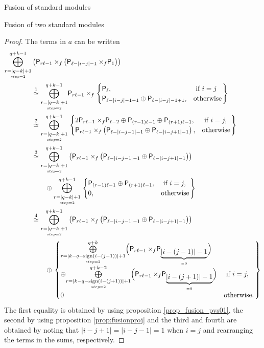 \documentclass[reqno]{amsart}
\newcommand{\dP}[1]{\mathsf P_{#1}}
\newcommand{\xf}{\times\hspace{-0.27em}_f}
\newcommand{\lc}{\ell}
\begin{document}
\begin{section}{Fusion of standard modules}
\begin{subsection}{Fusion of two standard modules}
\begin{proof}
The terms in $a$ can be written
\begin{align}
\overset{q+k-1}{\underset{\underset{step =2}{r = |q-k|+1}}{\bigoplus}}&\left(\dP{r \lc -1} \xf \left(\dP{\lc-|i-j|-1}\xf \dP{1} \right)\right) \notag\\
& \overset{1}{\simeq} \overset{q+k-1}{\underset{\underset{step =2}{r = |q-k|+1}}{\bigoplus}} \dP{r \lc -1} \xf \left. \begin{cases}
 \dP{\lc}, & \text{ if } i=j \\
\dP{\lc -|i-j|-1 -1}\oplus \dP{\lc -|i-j|-1 +1}, & \text{otherwise}
\end{cases} \right\rbrace \notag\\
& \overset{2}{\simeq} \overset{q+k-1}{\underset{\underset{step =2}{r = |q-k|+1}}{\bigoplus}} \left. \begin{cases}
2\dP{r \lc -1} \xf \dP{\lc -2} \oplus \dP{(r-1)\lc -1} \oplus \dP{(r+1)\lc -1}, & \text{ if } i=j,\\
\dP{r \lc -1} \xf \left(\dP{\lc -|i-j-1| -1}\oplus \dP{\lc -|i-j+1| - 1} \right) , & \text{otherwise}
\end{cases}\right\rbrace \notag\\
& \overset{3}{\simeq} \overset{q+k-1}{\underset{\underset{step =2}{r = |q-k|+1}}{\bigoplus}} \left(\dP{r \lc -1} \xf \left(\dP{\lc -|i-j-1| -1}\oplus \dP{\lc -|i-j+1| - 1} \right) \right) \notag\\
& \qquad \oplus \overset{q+k-1}{\underset{\underset{step =2}{r = |q-k|+1}}{\bigoplus}} \left. \begin{cases}
\dP{(r-1)\lc -1} \oplus \dP{(r+1)\lc -1}, & \text{ if } i=j,\\
0, & \text{otherwise}
\end{cases}\right\rbrace \notag\\
& \overset{4}{\simeq} \overset{q+k-1}{\underset{\underset{step =2}{r = |q-k|+1}}{\bigoplus}} \left(\dP{r \lc -1} \xf \left(\dP{\lc -|i-j-1| -1}\oplus \dP{\lc -|i-j+1| - 1} \right) \right) \notag\\
 & \qquad \oplus \left. 
 \begin{cases}
\overset{q+k}{\underset{\underset{step =2}{r = |k-q-\text{sign}(i-(j-1))| + 1}}{\bigoplus}}\Big(\dP{r \lc -1} \xf \dP{\underbrace{|i-(j-1)|-1}_{= 0}}\Big) & \\
\oplus \overset{q+k-2}{\underset{\underset{step =2}{r = |k-q-\text{sign}(i-(j+1))| + 1}}{\bigoplus}}\Big(\dP{r \lc -1} \xf \dP{\underbrace{|i-(j+1)|-1}_{= 0}}\Big) & \text{ if } i=j,\\
0 & \text{otherwise}.
\end{cases}\right\rbrace
\end{align}
The first equality is obtained by using proposition \ref{prop_fusion_pvs01}, the second by using proposition \ref{prop:fusionproj} and the third and fourth are obtained by noting that $|i-j+1| = |i-j-1| = 1$ when $i=j$ and rearranging the terms in the sums, respectively.


\end{proof}
\end{subsection}
\end{section}
\end{document}
